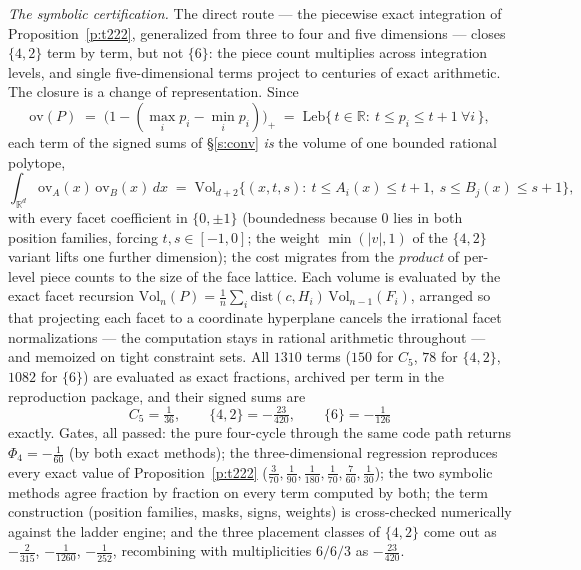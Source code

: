 \documentclass[11pt]{article}
\numberwithin{equation}{section}
\theoremstyle{definition}
\theoremstyle{remark}
\begin{document}
\emph{The symbolic certification.} The direct route --- the
piecewise exact integration of Proposition~\ref{p:t222},
generalized from three to four and five dimensions --- closes
$\{4,2\}$ term by term, but not $\{6\}$: the piece count
multiplies across integration levels, and single
five-dimensional terms project to centuries of exact
arithmetic. The closure is a change of representation. Since
\[
\mathrm{ov}(P)\;=\;\bigl(1-(\max_i p_i-\min_i p_i)\bigr)_+
\;=\;\mathrm{Leb}\{\,t\in\mathbb R:\ t\le p_i\le t+1\ \forall
i\,\},
\]
each term of the signed sums of \S\ref{s:conv} \emph{is} the
volume of one bounded rational polytope,
\[
\int_{\mathbb R^d}\mathrm{ov}_A(x)\,\mathrm{ov}_B(x)\,dx
\;=\;\mathrm{Vol}_{d+2}\bigl\{(x,t,s):\ t\le A_i(x)\le t+1,\
s\le B_j(x)\le s+1\bigr\},
\]
with every facet coefficient in $\{0,\pm1\}$ (boundedness
because $0$ lies in both position families, forcing
$t,s\in[-1,0]$; the weight $\min(|v|,1)$ of the $\{4,2\}$
variant lifts one further dimension); the cost migrates from
the \emph{product} of per-level piece counts to the size of
the face lattice. Each volume is evaluated by the exact facet
recursion
$\mathrm{Vol}_n(P)=\tfrac1n\sum_i\mathrm{dist}(c,H_i)\,
\mathrm{Vol}_{n-1}(F_i)$, arranged so that projecting each
facet to a coordinate hyperplane cancels the irrational facet
normalizations --- the computation stays in rational
arithmetic throughout --- and memoized on tight constraint
sets. All $1310$ terms ($150$ for $C_5$, $78$ for $\{4,2\}$,
$1082$ for $\{6\}$) are evaluated as exact fractions, archived
per term in the reproduction package, and their signed sums
are
\[
C_5=\tfrac1{36},\qquad \{4,2\}=-\tfrac{23}{420},\qquad
\{6\}=-\tfrac1{126}
\]
exactly. Gates, all passed: the pure four-cycle through the
same code path returns $\Phi_4=-\tfrac1{60}$ (by both exact
methods); the three-dimensional regression reproduces every
exact value of Proposition~\ref{p:t222}
($\tfrac3{70},\tfrac1{90},\tfrac1{180},\tfrac1{70},
\tfrac7{60},\tfrac1{30}$); the two symbolic methods agree
fraction by fraction on every term computed by both; the term
construction (position families, masks, signs, weights) is
cross-checked numerically against the ladder engine; and the
three placement classes of $\{4,2\}$ come out as
$-\tfrac2{315}$, $-\tfrac1{1260}$, $-\tfrac1{252}$,
recombining with multiplicities $6/6/3$ as
$-\tfrac{23}{420}$.
\end{document}
